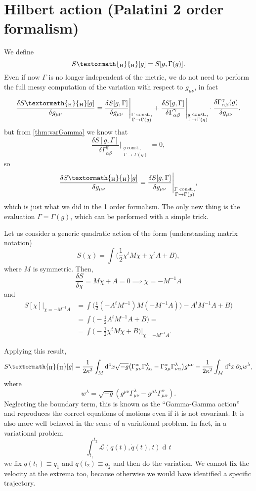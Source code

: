 \documentclass[a4paper,12pt]{book}
\newcommand{\ped}[1]{\textormath{\textsubscript{#1}}{_{\mathrm{#1}}}}
\newcommand{\ap}[1]{\textormath{\textsuperscript{#1}}{^{\mathrm{#1}}}}
\newcommand{\dd}{\mathop{\mathrm{d}\!}{}}
\theoremstyle{definition}
\theoremstyle{remark}
\begin{document}
\section{Hilbert action (Palatini 2\ap{nd} order formalism)}
We define
\[S\ped{H}[g]=S[g,\Gamma(g)].\]
Even if now $\Gamma$ is no longer independent of the metric, we do not need to perform the full messy computation of the variation with respect to $g_{\mu\nu}$, in fact
\[\frac{\delta S\ped{H}[g]}{\delta g_{\mu\nu}}=\frac{\delta S[g,\Gamma]}{\delta g_{\mu\nu}}\Bigg|_{\substack{\Gamma\text{ const.},\\ \Gamma\to\Gamma(g)}}+\frac{\delta S[g,\Gamma]}{\delta \Gamma^\gamma_{\alpha\beta}}\Bigg|_{\substack{g\text{ const.},\\ \Gamma\to\Gamma(g)}}\cdot\frac{\delta\Gamma^\gamma_{\alpha\beta}(g)}{\delta g_{\mu\nu}},\]
but from \cref{thm:varGamma} we know that
\[\frac{\delta S[g,\Gamma]}{\delta \Gamma^\gamma_{\alpha\beta}}\Bigg|_{\substack{g\text{ const.},\\ \Gamma\to\Gamma(g)}}=0,\]
so
\[\frac{\delta S\ped{H}[g]}{\delta g_{\mu\nu}}=\frac{\delta S[g,\Gamma]}{\delta g_{\mu\nu}}\Bigg|_{\substack{\Gamma\text{ const.},\\ \Gamma\to\Gamma(g)}},\]
which is just what we did in the 1\ap{st} order formalism. The only new thing is the evaluation $\Gamma=\Gamma(g)$, which can be performed with a simple trick.

Let us consider a generic quadratic action of the form (understanding matrix notation)
\[S(\chi)=\int\biggl(\frac12\chi^t M\chi+\chi^t A+B\biggr),\]
where $M$ is symmetric. Then,
\[\frac{\delta S}{\delta\chi}=M\chi+A=0\implies \chi=-M^{-1}A\]
and
\begin{align*}
S[\chi]\Big|_{\chi=-M^{-1}A}&=\int\biggl(\frac12(-A^tM^{-1})M(-M^{-1}A))-A^tM^{-1}A+B\biggr)\\
&=\int\biggl(-\frac12A^tM^{-1}A+B\biggr)=\\
&=\int\biggl(-\frac12\chi^tM\chi+B\biggr)\bigg|_{\chi=-M^{-1}A}.
\end{align*}

Applying this result,
\begin{align*}
S\ped{H}[g]=\frac1{2\kappa^2}\int_M\dd^4x\sqrt{-g}\bigl(\Gamma^\alpha_{\mu\nu}\Gamma^\lambda_{\lambda\alpha}-\Gamma^\alpha_{\lambda\mu}\Gamma^\lambda_{\nu\alpha}\bigr)g^{\mu\nu}-\frac1{2\kappa^2}\int_M\dd^4x\,\partial_\lambda w^\lambda,
\end{align*}
where
\[w^\lambda=\sqrt{-g}(g^{\mu\nu}\Gamma^\lambda_{\mu\nu}-g^{\mu\lambda}\Gamma^\alpha_{\mu\alpha}).\]
Neglecting the boundary term, this is known as the ``Gamma-Gamma action'' and reproduces the correct equations of motions even if it is not covariant. It is also more well-behaved in the sense of a variational problem. In fact, in a variational problem
\[\int_{t_1}^{t_2}\mathcal L(q(t),\dot q(t),t)\dd t\]
we fix $q(t_1)\equiv q_1$ and $q(t_2)\equiv q_2$ and then do the variation. We cannot fix the velocity at the extrema too, because otherwise we would have identified a specific trajectory.
\end{document}
